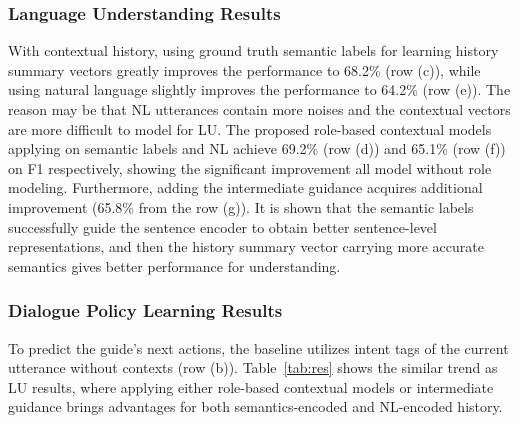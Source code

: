 \documentclass[11pt,letterpaper]{article}
\begin{document}
\subsubsection{Language Understanding Results}
\label{ssec:luresults}
With contextual history, using ground truth semantic labels for learning history summary vectors greatly improves the performance to 68.2\% (row (c)), while using natural language slightly improves the performance to 64.2\% (row (e)).
The reason may be that NL utterances contain more noises and the contextual vectors are more difficult to model for LU.
The proposed role-based contextual models applying on semantic labels and NL achieve 69.2\% (row (d)) and 65.1\% (row (f)) on F1 respectively, showing the significant improvement all model without role modeling.
Furthermore, adding the intermediate guidance acquires additional improvement (65.8\% from the row (g)).
It is shown that the semantic labels successfully guide the sentence encoder to obtain better sentence-level representations, and then the history summary vector carrying more accurate semantics gives better performance for understanding.

\subsubsection{Dialogue Policy Learning Results}
\label{ssec:policyresults}
To predict the guide's next actions, 
the baseline utilizes intent tags of the current utterance without contexts (row (b)).
Table~\ref{tab:res} shows the similar trend as LU results, where applying either role-based contextual models or intermediate guidance brings advantages for both semantics-encoded and NL-encoded history.
\end{document}
